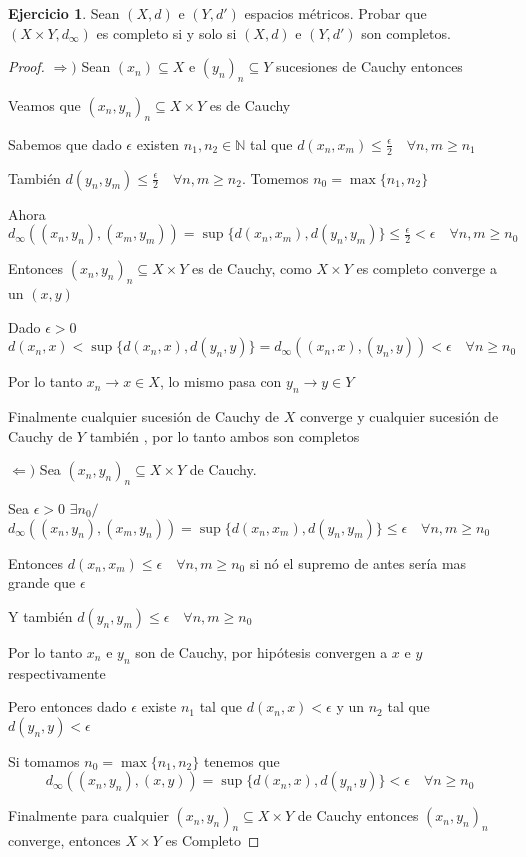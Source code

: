\documentclass[12pt]{article}
\newcommand{\N}{\mathbb{N}}
\newcommand{\Ra}{\Rightarrow}
\newcommand{\ra}{\rightarrow}
\theoremstyle{definition}
\newtheorem{ej}{Ejercicio}
\begin{document}
\begin{ej}
  Sean $(X,d)$ e $(Y,d')$ espacios métricos. Probar que $(X \times Y ,d_{\infty})$ es completo si y solo si $(X,d)$ e $(Y,d')$ son completos.
  \begin{proof}
$\Ra )$ Sean $(x_n) \subseteq X$ e $(y_n)_n \subseteq Y$ sucesiones de Cauchy entonces 

Veamos que $(x_n,y_n)_n \subseteq X \times Y$ es de Cauchy

Sabemos que dado $\epsilon$ existen $n_1, n_2 \in \N$ tal que $d(x_n,x_m) \leq \frac{\epsilon}{2} \quad \forall n,m \geq n_1$

También $d(y_n,y_m) \leq \frac{\epsilon}{2} \quad \forall n,m \geq n_2$. Tomemos $n_0 = \max\{n_1,n_2\}$

Ahora $d_{\infty}( (x_n,y_n),(x_m,y_m)) = \sup \{d(x_n,x_m),d(y_n,y_m)\} \leq \frac{\epsilon}{2} < \epsilon \quad \forall n,m \geq n_0$

Entonces $(x_n,y_n)_n \subseteq X \times Y$ es de Cauchy, como $X \times Y$ es completo converge a un $(x,y)$

Dado $\epsilon > 0 \quad $  $d(x_n,x) < \sup\{d(x_n,x),d(y_n,y)\} = d_{\infty}( (x_n,x),(y_n,y)) < \epsilon \quad \forall n \geq n_0$

Por lo tanto $x_n \ra x \in X$, lo mismo pasa con $y_n \ra y \in Y$

Finalmente cualquier sucesión de Cauchy de $X$ converge y cualquier sucesión de Cauchy de $Y$ también , por lo tanto ambos son completos

$\Leftarrow )$ Sea $(x_n,y_n)_n \subseteq X \times Y$ de Cauchy. 

Sea $\epsilon > 0$ $\exists n_0/ \quad$ $d_{\infty}( (x_n,y_n),(x_m,y_n)) = \sup\{d(x_n,x_m),d(y_n,y_m)\} \leq \epsilon \quad \forall n,m \geq n_0$

Entonces $d(x_n,x_m) \leq \epsilon \quad \forall n,m \geq n_0$ si nó el supremo de antes sería mas grande que $\epsilon$ 

Y también $d(y_n,y_m) \leq \epsilon \quad \forall n,m \geq n_0$

Por lo tanto $x_n$ e $y_n$ son de Cauchy, por hipótesis convergen a $x$ e $y$ respectivamente

Pero entonces dado $\epsilon$ existe $n_1$ tal que $d(x_n,x) < \epsilon$ y un $n_2$ tal que $d(y_n,y) < \epsilon$

Si tomamos $n_0 = \max\{n_1,n_2\}$ tenemos que
$$d_{\infty}( (x_n,y_n),(x,y)) = \sup\{d(x_n,x),d(y_n,y)\} < \epsilon \quad \forall n \geq n_0$$

Finalmente para cualquier $(x_n,y_n)_n \subseteq X \times Y$ de Cauchy entonces $(x_n,y_n)_n$ converge, entonces $X \times Y$ es Completo
  \end{proof} 
\end{ej}
\end{document}
